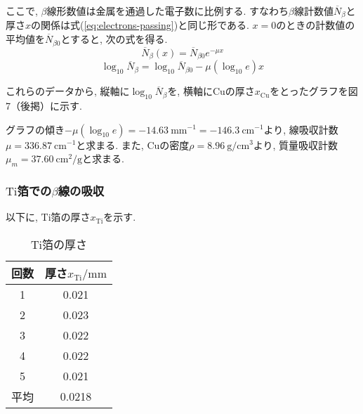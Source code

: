 \documentclass{jarticle}
\begin{document}
ここで, $\beta$線形数値は金属を通過した電子数に比例する.
すなわち$\beta$線計数値$\overline{N}_\beta$と厚さ$x$の関係は式(\ref{eq:electrons-passing})と同じ形である.
$x=0$のときの計数値の平均値を$\overline{N}_{\beta 0}$とすると, 次の式を得る.
\begin{equation}
  \overline{N}_\beta (x) = \overline{N}_{\beta 0} e^{-\mu x}
\end{equation}
\begin{equation}
  \log_{10}\overline{N}_\beta = \log_{10}\overline{N}_{\beta 0} - \mu(\log_{10}e)x
\end{equation}

これらのデータから, 縦軸に$\log_{10}\overline{N}_\beta$を, 横軸に$\mathrm{Cu}$の厚さ$x_\mathrm{Cu}$をとったグラフを図7（後掲）に示す.


グラフの傾き$-\mu(\log_{10}e)=-14.63\ \mathrm{mm}^{-1}=-146.3\ \mathrm{cm}^{-1}$より, 線吸収計数$\mu=336.87\ \mathrm{cm}^{-1}$と求まる.
また, $\mathrm{Cu}$の密度$\rho=8.96\ \mathrm{g}/\mathrm{cm}^3$\cite{金属の密度}より, 質量吸収計数$\mu_m=37.60\ \mathrm{cm}^2/\mathrm{g}$と求まる.


\subsubsection{$\mathrm{Ti}$箔での$\beta$線の吸収}

以下に, $\mathrm{Ti}$箔の厚さ$x_\mathrm{Ti}$を示す.

\begin{table}[H]
  \centering
  \caption{$\mathrm{Ti}$箔の厚さ}
  \label{tb:Ti-foil-thickness}
  \begin{tabular}{cc}
    \hline
    回数 & 厚さ$x_\mathrm{Ti}/\mathrm{mm}$ \\
    \hline
    1 & 0.021 \\
    2 & 0.023 \\
    3 & 0.022 \\
    4 & 0.022 \\
    5 & 0.021 \\
    \hline
    平均 & 0.0218 \\
    \hline
  \end{tabular}
\end{table}
\end{document}
